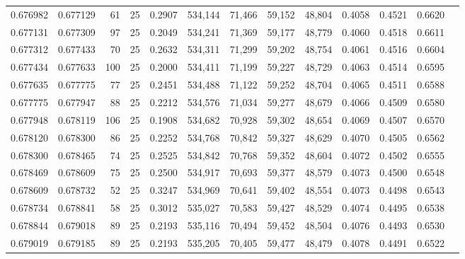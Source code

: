 \begin{tabular}{rrrrrrrrrrrrr}
0.676982 & 0.677129 &    61 &  25 &                                     0.2907 & 534,144 &  71,466 &  59,152 &  48,804 & 0.4058 & 0.4521 & 0.6620 \\
0.677131 & 0.677309 &    97 &  25 &                                     0.2049 & 534,241 &  71,369 &  59,177 &  48,779 & 0.4060 & 0.4518 & 0.6611 \\
0.677312 & 0.677433 &    70 &  25 &                                     0.2632 & 534,311 &  71,299 &  59,202 &  48,754 & 0.4061 & 0.4516 & 0.6604 \\
0.677434 & 0.677633 &   100 &  25 &                                     0.2000 & 534,411 &  71,199 &  59,227 &  48,729 & 0.4063 & 0.4514 & 0.6595 \\
0.677635 & 0.677775 &    77 &  25 &                                     0.2451 & 534,488 &  71,122 &  59,252 &  48,704 & 0.4065 & 0.4511 & 0.6588 \\
0.677775 & 0.677947 &    88 &  25 &                                     0.2212 & 534,576 &  71,034 &  59,277 &  48,679 & 0.4066 & 0.4509 & 0.6580 \\
0.677948 & 0.678119 &   106 &  25 &                                     0.1908 & 534,682 &  70,928 &  59,302 &  48,654 & 0.4069 & 0.4507 & 0.6570 \\
0.678120 & 0.678300 &    86 &  25 &                                     0.2252 & 534,768 &  70,842 &  59,327 &  48,629 & 0.4070 & 0.4505 & 0.6562 \\
0.678300 & 0.678465 &    74 &  25 &                                     0.2525 & 534,842 &  70,768 &  59,352 &  48,604 & 0.4072 & 0.4502 & 0.6555 \\
0.678469 & 0.678609 &    75 &  25 &                                     0.2500 & 534,917 &  70,693 &  59,377 &  48,579 & 0.4073 & 0.4500 & 0.6548 \\
0.678609 & 0.678732 &    52 &  25 &                                     0.3247 & 534,969 &  70,641 &  59,402 &  48,554 & 0.4073 & 0.4498 & 0.6543 \\
0.678734 & 0.678841 &    58 &  25 &                                     0.3012 & 535,027 &  70,583 &  59,427 &  48,529 & 0.4074 & 0.4495 & 0.6538 \\
0.678844 & 0.679018 &    89 &  25 &                                     0.2193 & 535,116 &  70,494 &  59,452 &  48,504 & 0.4076 & 0.4493 & 0.6530 \\
0.679019 & 0.679185 &    89 &  25 &                                     0.2193 & 535,205 &  70,405 &  59,477 &  48,479 & 0.4078 & 0.4491 & 0.6522 \\

\end{tabular}
